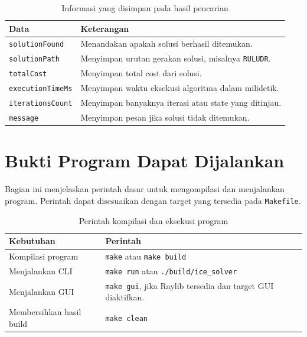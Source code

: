 \begin{table}[H]
	\centering
	\caption{Informasi yang disimpan pada hasil pencarian}
	\begin{tabular}{|p{4cm}|p{10cm}|}
		\hline
		\rowcolor{blue!15}
		\textbf{Data} & \textbf{Keterangan} \\
		\hline
		\texttt{solutionFound} & Menandakan apakah solusi berhasil ditemukan. \\
		\hline
		\texttt{solutionPath} & Menyimpan urutan gerakan solusi, misalnya \texttt{RULUDR}. \\
		\hline
		\texttt{totalCost} & Menyimpan total cost dari solusi. \\
		\hline
		\texttt{executionTimeMs} & Menyimpan waktu eksekusi algoritma dalam milidetik. \\
		\hline
		\texttt{iterationsCount} & Menyimpan banyaknya iterasi atau state yang ditinjau. \\
		\hline
		\texttt{message} & Menyimpan pesan jika solusi tidak ditemukan. \\
		\hline
	\end{tabular}
\end{table}

\section{Bukti Program Dapat Dijalankan}

Bagian ini menjelaskan perintah dasar untuk mengompilasi dan menjalankan program. 
Perintah dapat disesuaikan dengan target yang tersedia pada \texttt{Makefile}.

\begin{table}[H]
	\centering
	\caption{Perintah kompilasi dan eksekusi program}
	\begin{tabular}{|p{4cm}|p{10cm}|}
		\hline
		\rowcolor{purple!15}
		\textbf{Kebutuhan} & \textbf{Perintah} \\
		\hline
		Kompilasi program & \texttt{make} atau \texttt{make build} \\
		\hline
		Menjalankan CLI & \texttt{make run} atau \texttt{./build/ice\_solver} \\
		\hline
		Menjalankan GUI & \texttt{make gui}, jika Raylib tersedia dan target GUI diaktifkan. \\
		\hline
		Membersihkan hasil build & \texttt{make clean} \\
		\hline
	\end{tabular}
\end{table}

